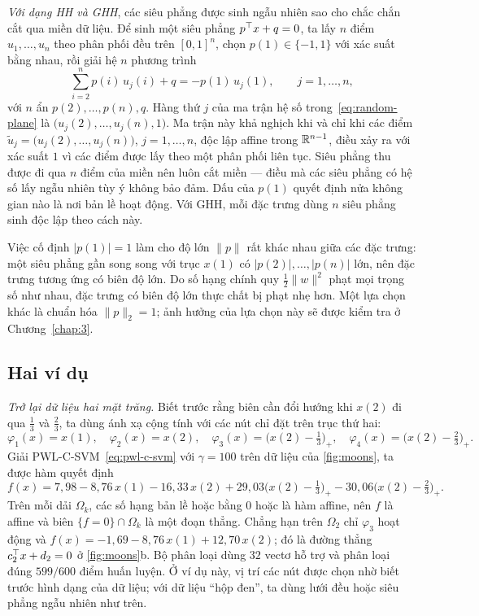 \emph{Với dạng HH và GHH}, các siêu phẳng được sinh ngẫu nhiên sao cho chắc chắn cắt qua miền dữ liệu. Để sinh một siêu phẳng $p^\top x+q=0$, ta lấy $n$ điểm $u_1,\dots,u_n$ theo phân phối đều trên $[0,1]^n$, chọn $p(1)\in\{-1,1\}$ với xác suất bằng nhau, rồi giải hệ $n$ phương trình
\begin{equation}\label{eq:random-plane}
\sum_{i=2}^{n}p(i)\,u_j(i)+q=-p(1)\,u_j(1),\qquad j=1,\dots,n,
\end{equation}
với $n$ ẩn $p(2),\dots,p(n),q$. Hàng thứ $j$ của ma trận hệ số trong~\eqref{eq:random-plane} là $\bigl(u_j(2),\dots,u_j(n),1\bigr)$. Ma trận này khả nghịch khi và chỉ khi các điểm $\tilde u_j=\bigl(u_j(2),\dots,u_j(n)\bigr)$, $j=1,\dots,n$, độc lập affine trong $\mathbb{R}^{n-1}$, điều xảy ra với xác suất $1$ vì các điểm được lấy theo một phân phối liên tục. Siêu phẳng thu được đi qua $n$ điểm của miền nên luôn cắt miền --- điều mà các siêu phẳng có hệ số lấy ngẫu nhiên tùy ý không bảo đảm. Dấu của $p(1)$ quyết định nửa không gian nào là nơi bản lề hoạt động. Với GHH, mỗi đặc trưng dùng $n$ siêu phẳng sinh độc lập theo cách này.

\begin{remark}\label{rem:scale}
Việc cố định $|p(1)|=1$ làm cho độ lớn $\|p\|$ rất khác nhau giữa các đặc trưng: một siêu phẳng gần song song với trục $x(1)$ có $|p(2)|,\dots,|p(n)|$ lớn, nên đặc trưng tương ứng có biên độ lớn. Do số hạng chính quy $\frac12\|w\|^2$ phạt mọi trọng số như nhau, đặc trưng có biên độ lớn thực chất bị phạt nhẹ hơn. Một lựa chọn khác là chuẩn hóa $\|p\|_2=1$; ảnh hưởng của lựa chọn này sẽ được kiểm tra ở Chương~\ref{chap:3}.
\end{remark}

\subsection{Hai ví dụ}

\emph{Trở lại dữ liệu hai mặt trăng.} Biết trước rằng biên cần đổi hướng khi $x(2)$ đi qua $\tfrac13$ và $\tfrac23$, ta dùng ánh xạ cộng tính với các nút chỉ đặt trên trục thứ hai:
\[
\varphi_1(x)=x(1),\quad \varphi_2(x)=x(2),\quad \varphi_3(x)=\bigl(x(2)-\tfrac13\bigr)_+,\quad \varphi_4(x)=\bigl(x(2)-\tfrac23\bigr)_+ .
\]
Giải PWL-C-SVM~\eqref{eq:pwl-c-svm} với $\gamma=100$ trên dữ liệu của \cref{fig:moons}, ta được hàm quyết định
\[
f(x)=7{,}98-8{,}76\,x(1)-16{,}33\,x(2)+29{,}03\bigl(x(2)-\tfrac13\bigr)_+-30{,}06\bigl(x(2)-\tfrac23\bigr)_+ .
\]
Trên mỗi dải $\Omega_k$, các số hạng bản lề hoặc bằng $0$ hoặc là hàm affine, nên $f$ là affine và biên $\{f=0\}\cap\Omega_k$ là một đoạn thẳng. Chẳng hạn trên $\Omega_2$ chỉ $\varphi_3$ hoạt động và $f(x)=-1{,}69-8{,}76\,x(1)+12{,}70\,x(2)$; đó là đường thẳng $c_2^\top x+d_2=0$ ở \cref{fig:moons}b. Bộ phân loại dùng $32$ vectơ hỗ trợ và phân loại đúng $599/600$ điểm huấn luyện. Ở ví dụ này, vị trí các nút được chọn nhờ biết trước hình dạng của dữ liệu; với dữ liệu “hộp đen”, ta dùng lưới đều hoặc siêu phẳng ngẫu nhiên như trên.

